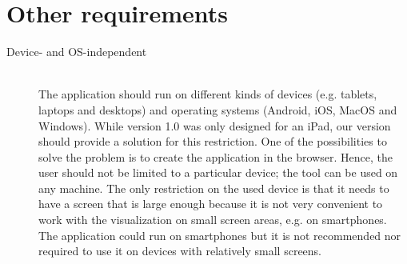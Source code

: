 \section{Other requirements}\label{sec:other-requirements}

\begin{description}
	\item[Device- and OS-independent] \hfill \\
	The application should run on different kinds of devices (e.g. tablets, laptops and desktops) and operating systems (Android, iOS, MacOS and Windows). While version 1.0 was only designed for an iPad, our version should provide a solution for this restriction. One of the possibilities to solve the problem is to create the application in the browser. Hence, the user should not be limited to a particular device; the tool can be used on any machine. The only restriction on the used device is that it needs to have a screen that is large enough because it is not very convenient to work with the visualization on small screen areas, e.g. on smartphones. The application could run on smartphones but it is not recommended nor required to use it on devices with relatively small screens.

\end{description}

